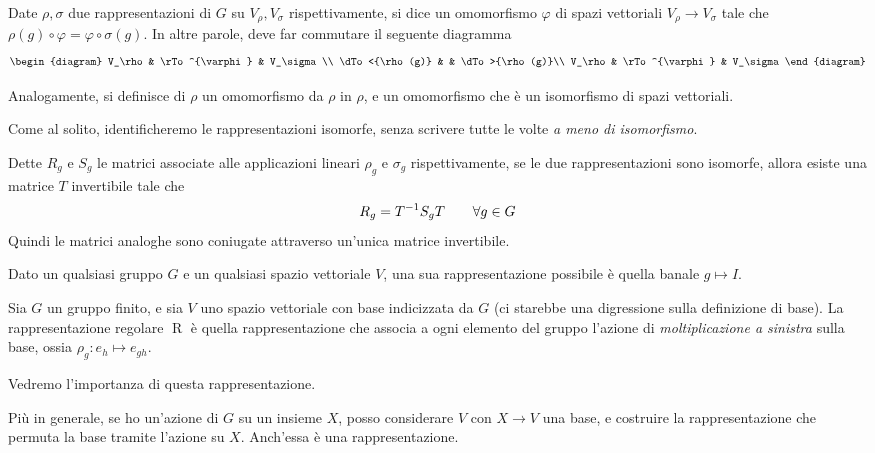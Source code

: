 \documentclass[a4paper,10pt,oneside]{math_article}
\renewcommand{\phi}{\varphi}
\newcommand{\id}{I}
\DeclareMathOperator{\Reg}{R}
\begin{document}
    
    \begin{mydef}
      Date $\rho,\sigma$ due rappresentazioni di $G$ su $V_\rho,V_\sigma$ rispettivamente, si dice  un omomorfismo $\phi$ di spazi vettoriali $V_\rho \rightarrow V_\sigma$ tale che $\rho(g) \circ \phi = \phi \circ \sigma(g)$. 
      In altre parole, deve far commutare il seguente diagramma
      \[
       \begin{diagram}
	V_\rho         & \rTo^{\phi}  & V_\sigma\\
	\dTo<{\rho(g)} &           	 & \dTo>{\rho(g)}\\
	V_\rho         & \rTo^{\phi}  & V_\sigma
       \end{diagram}
      \]
       
    Analogamente, si definisce  di $\rho$ un omomorfismo da $\rho$ in $\rho$, e  un omomorfismo che è un isomorfismo di spazi vettoriali.
    \end{mydef}
    
    Come al solito, identificheremo le rappresentazioni isomorfe, senza scrivere tutte le volte \emph{a meno di isomorfismo}.
    
    Dette $R_g$ e $S_g$ le matrici associate alle applicazioni lineari $\rho_g$ e $\sigma_g$ rispettivamente, se le due rappresentazioni sono isomorfe, allora esiste una matrice $T$ invertibile tale che
    \[
     R_g = T^{-1} S_g T \qquad \forall g\in G
    \]
    Quindi le matrici analoghe sono coniugate attraverso un'unica matrice invertibile.
        
    \begin{myexample}
     Dato un qualsiasi gruppo $G$ e un qualsiasi spazio vettoriale $V$, una sua rappresentazione possibile è quella banale $g \mapsto \id$.
    \end{myexample}
    \begin{myexample}
     Sia $G$ un gruppo finito, e sia $V$ uno spazio vettoriale con base indicizzata da $G$ (ci starebbe una digressione sulla definizione di base). La rappresentazione regolare $\Reg$ è quella rappresentazione che associa a ogni elemento del gruppo l'azione di \emph{moltiplicazione a sinistra} sulla base, ossia $\rho_g: e_h \mapsto e_{gh}$.
     
     Vedremo l'importanza di questa rappresentazione.
     \end{myexample}
     \begin{myexample}
      Più in generale, se ho un'azione di $G$ su un insieme $X$, posso considerare $V$ con $X\rightarrow V$ una base, e costruire la rappresentazione che permuta la base tramite l'azione su $X$. Anch'essa è una rappresentazione.
    \end{myexample}
  
\end{document}
